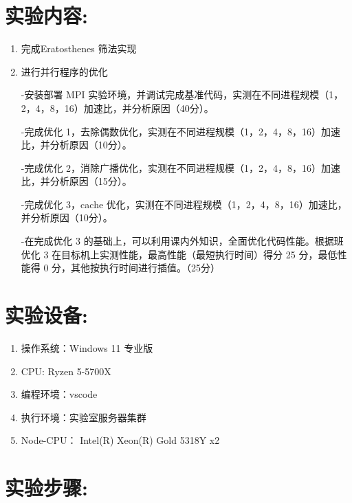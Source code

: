 \documentclass[a4paper,11pt,UTF8]{ctexart}
\begin{document}
\section{实验内容:}

\begin{enumerate}
  \item 完成Eratosthenes 筛法实现
  \item 进行并行程序的优化
  
  -安装部署 MPI 实验环境，并调试完成基准代码，实测在不同进程规模（1，2，4，8，16）加速比，并分析原因（40分）。

  -完成优化 1，去除偶数优化，实测在不同进程规模（1，2，4，8，16）加速比，并分析原因（10分）。

  -完成优化 2，消除广播优化，实测在不同进程规模（1，2，4，8，16）加速比，并分析原因（15分）。

  -完成优化 3，cache 优化，实测在不同进程规模（1，2，4，8，16）加速比，并分析原因（10分）。

  -在完成优化 3 的基础上，可以利用课内外知识，全面优化代码性能。根据班优化 3 在目标机上实测性能，最高性能（最短执行时间）得分 25 分，最低性能得 0 分，其他按执行时间进行插值。（25分）

\end{enumerate}

\section{实验设备:}

\begin{enumerate}
  \item 操作系统：Windows 11 专业版
  \item CPU: Ryzen 5-5700X
  \item 编程环境：vscode
  \item 执行环境：实验室服务器集群
  \item Node-CPU： Intel(R) Xeon(R) Gold 5318Y x2
\end{enumerate}
\section{实验步骤:}
\end{document}
